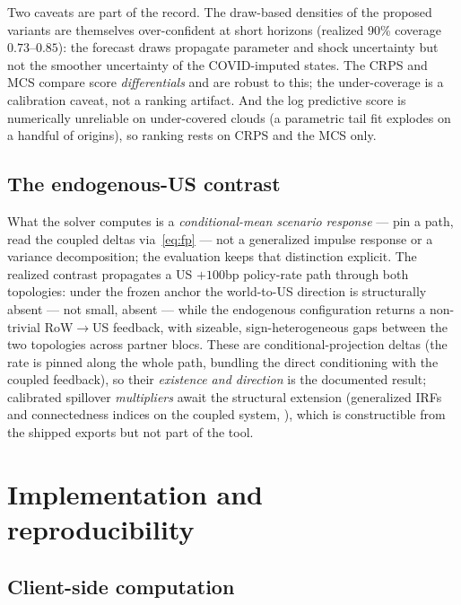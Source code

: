 \documentclass[11pt]{article}
\theoremstyle{plain}
\theoremstyle{remark}
\begin{document}
Two caveats are part of the record. The draw-based densities of the
proposed variants are themselves over-confident at short horizons
(realized 90\% coverage $0.73$--$0.85$): the forecast draws propagate
parameter and shock uncertainty but not the smoother uncertainty of the
COVID-imputed states. The CRPS and MCS compare score
\emph{differentials} and are robust to this; the under-coverage is a
calibration caveat, not a ranking artifact. And the log predictive score
is numerically unreliable on under-covered clouds (a parametric tail fit
explodes on a handful of origins), so ranking rests on CRPS and the MCS
only.

\subsection{The endogenous-US contrast}\label{sec:spillover}

What the solver computes is a \emph{conditional-mean scenario response}
--- pin a path, read the coupled deltas via~\eqref{eq:fp} --- not a
generalized impulse response or a variance decomposition; the evaluation
keeps that distinction explicit. The realized contrast propagates a
US $+100$bp policy-rate path through both topologies: under the frozen
anchor the world-to-US direction is structurally absent --- not small,
absent --- while the endogenous configuration returns a non-trivial
RoW$\to$US feedback, with sizeable, sign-heterogeneous gaps between the
two topologies across partner blocs. These are conditional-projection
deltas (the rate is pinned along the whole path, bundling the direct
conditioning with the coupled feedback), so their \emph{existence and
direction} is the documented result; calibrated spillover
\emph{multipliers} await the structural extension (generalized IRFs and
connectedness indices on the coupled system,
\citealp{PesaranShin1998, DieboldYilmaz2012}), which is constructible
from the shipped exports but not part of the tool.

\section{Implementation and reproducibility}\label{sec:impl}

\subsection{Client-side computation}\label{sec:client}
\end{document}
